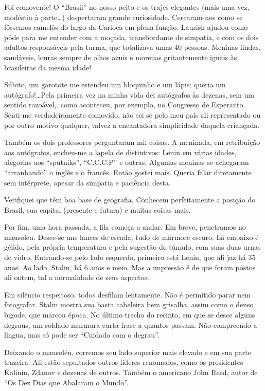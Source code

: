 Foi comovente! O “Brasil” no nosso peito e os trajes elegantes (mais uma vez, modéstia à parte\ldots) despertaram grande curiosidade. Cercaram-nos como se fôssemos camelôs do largo da Carioca em plena função. Laurish ajudou como pôde para me entender com a moçada, transbordante de simpatia, e com os dois adultos responsáveis pela turma, que totalizava umas 40 pessoas. Meninas lindas, saudáveis, louras sempre de olhos azuis e morenas gritantemente iguais às brasileiras da mesma idade!

Súbito, um garotote me estendeu um bloquinho e um lápis: queria um autógrafo!\ldots Pela primeira vez na minha vida dei autógrafos às dezenas, sem um sentido razoável,. como aconteceu, por exemplo, no Congresso de Esperanto. Senti-me verdadeiramente comovido, não sei se pelo meu país ali representado ou por outro motivo qualquer, talvez a encantadora simplicidade daquela criançada.

Também os dois professores perguntaram mil coisas. A meninada, em retribuição aos autógrafos, encheu-me a lapela de distintivos: Lenin em várias idades, alegorias aos “sputniks”, “C.C.C.P” e outras. Algumas meninas se achegaram “arranhando” o inglês e o francês. Então gostei mais. Queria falar diretamente sem intérprete, apesar da simpatia e paciência desta.

Verifiquei que têm boa base de geografia. Conhecem perfeitamente a posição do Brasil, sua capital (presente e futura) e muitas coisas mais.

Por fim, uma hora passada, a fila começa a andar. Em breve, penetramos no mausoléu. Desce-se uns lances de escada, tudo de mármore escuro. Lá embaixo é gélido, pela própria temperatura e pela sugestão do túmulo, com suas duas urnas de vidro. Entrando-se pelo lado esquerdo, primeiro está Lenin, que ali jaz há 35 anos. Ao lado, Stalin, há 6 anos e meio. Mas a impressão é de que foram postos ali ontem, tal a normalidade de seus aspectos.

Em silêncio respeitoso, todos desfilam lentamente. Não é permitido parar nem fotografar. Stalin mostra sua basta cabeleira bem grisalha, assim como o denso bigode, que marcou época. No último trecho do recinto, em que se desce alguns degraus, um soldado murmura curta frase a quantos passam. Não compreendo a língua, mas só pode ser “Cuidado com o degrau”.

Deixando o mausoléu, corremos seu lado superior mais elevado e em sua parte trazeira. Ali estão sepultados outros líderes renomados, como os presidentes Kalinin, Zdanov e dezenas de outros. Também o americano John Reed, autor de “Os Dez Dias que Abalaram o Mundo”.

